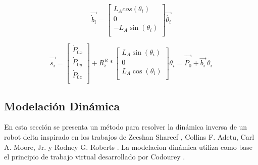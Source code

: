         \begin{equation}
                  \overrightarrow{\dot{b}_{i}}= \left[ \begin{matrix}
                L_{A} cos⁡ \left(  \theta _{i} \right) \\
                0\\
                - L_{A}\sin ⁡ \left(  \theta _{i} \right) \\
                \end{matrix}
                 \right] \overrightarrow{\dot{ \theta _{i}}}  
            \label{eq:cap4_MB_18}
        \end{equation} 
        
        \begin{equation}
                  \overrightarrow{\dot{s}_{i}}= \left[ \begin{matrix}
                \dot{P}_{0x}\\
                \dot{P}_{0y}\\
                \dot{P}_{0z}\\
                \end{matrix}
                 \right] +R_{i}^{R}\ast \left[ \begin{matrix}
                L_{A}\sin  \left(  \theta _{i} \right) \\
                0\\
                L_{A}\cos  \left(  \theta _{i} \right) \\
                \end{matrix}
                 \right] \dot{ \theta _{i}}=\overrightarrow{\dot{P_{0}}}+\overrightarrow{b_{i}}~\dot{ \theta _{i}} 
            \label{eq:cap4_MB_19}
        \end{equation} 

        


        








    \newpage

    \subsection{Modelación Dinámica}
    
        En esta sección se presenta un método para resolver la dinámica inversa de un robot delta inspirado en los trabajos de Zeeshan Shareef \cite{Path_Planning_and_Trajectory_Optimization}, Collins F. Adetu, Carl A. Moore, Jr. y Rodney G. Roberts \cite{dynamic_omega3}. La modelacion dinámica utiliza como base el principio de trabajo virtual desarrollado por Codourey \cite{Codourey_decoupling}.

